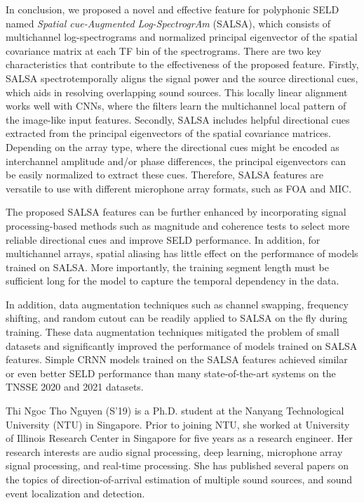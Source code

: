 \documentclass[journal]{IEEEtran}
\begin{document}
In conclusion, we proposed a novel and effective feature for polyphonic SELD named \emph{Spatial cue-Augmented Log-SpectrogrAm} (SALSA), which consists of multichannel log-spectrograms and normalized principal eigenvector of the spatial covariance matrix at each TF bin of the spectrograms. There are two key characteristics that contribute to the effectiveness of the proposed feature. Firstly, SALSA spectrotemporally aligns the signal power and the source directional cues, which aids in resolving overlapping sound sources. This locally linear alignment works well with CNNs, where the filters learn the multichannel local pattern of the image-like input features. Secondly, SALSA includes helpful directional cues extracted from the principal eigenvectors of the spatial covariance matrices. Depending on the array type, where the directional cues might be encoded as interchannel amplitude and/or phase differences, the principal eigenvectors can be easily normalized to extract these cues. Therefore, SALSA features are versatile to use with different microphone array formats, such as FOA and MIC. 

The proposed SALSA features can be further enhanced by incorporating signal processing-based methods such as magnitude and coherence tests to select more reliable directional cues and improve SELD performance. In addition, for multichannel arrays, spatial aliasing has little effect on the performance of models trained on SALSA. More importantly, the training segment length must be sufficient long for the model to capture the temporal dependency in the data.   

In addition, data augmentation techniques such as channel swapping, frequency shifting, and random cutout can be readily applied to SALSA on the fly during training. These data augmentation techniques mitigated the problem of small datasets and significantly improved the performance of models trained on SALSA features. Simple CRNN models trained on the SALSA features achieved similar or even better SELD performance than many state-of-the-art systems on the TNSSE 2020 and 2021 datasets.  



\clearpage
\begin{IEEEbiography}{Thi Ngoc Tho Nguyen} (S'19)
is a Ph.D. student at the Nanyang Technological University (NTU) in Singapore. Prior to joining NTU, she worked at University of Illinois Research Center in Singapore for five years as a research engineer. Her research interests are audio signal processing, deep learning, microphone array signal processing, and real-time processing. She has published several papers on the topics of direction-of-arrival estimation of multiple sound sources, and sound event localization and detection.
\end{IEEEbiography}
\end{document}

